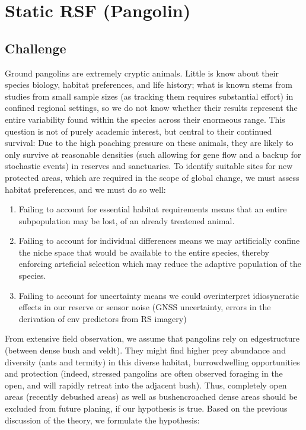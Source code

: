 \documentclass[letterpaper,10pt,english]{sphinxmanual}
\begin{document}
\section{Static RSF (Pangolin)}
\label{\detokenize{case-studies:static-rsf-pangolin}}

\subsection{Challenge}
\label{\detokenize{case-studies:challenge}}
\sphinxAtStartPar
Ground pangolins are extremely cryptic animals. Little is know about their species biology, habitat preferences, and life history; what is known stems from studies from small sample sizes (as tracking them requires substantial effort) in confined regional settings, so we do not know whether their results represent the entire variability found within the species across their enormeous range. This question is not of purely academic interest, but central to their continued survival: Due to the high poaching pressure on these animals, they are likely to only survive at reasonable densities (such allowing for gene flow and a back\sphinxhyphen{}up for stochastic events) in reserves and sanctuaries. To identify suitable sites for new protected areas, which are required in the scope of global change, we must assess habitat preferences, and we must do so well:
\begin{enumerate}
%
\item {} 
\sphinxAtStartPar
Failing to account for essential habitat requirements means that an entire subpopulation may be lost, of an already treatened animal.

\item {} 
\sphinxAtStartPar
Failing to account for individual differences means we may artificially confine the niche space that would be available to the entire species, thereby enforcing arteficial selection which may reduce the adaptive population of the species.

\item {} 
\sphinxAtStartPar
Failing to account for uncertainty means we could overinterpret idiosyncratic effects in our reserve or sensor noise (GNSS uncertainty, errors in the derivation of env predictors from RS imagery)

\end{enumerate}

\sphinxAtStartPar
From extensive field observation, we assume that pangolins rely on edge\sphinxhyphen{}structure (between dense bush and veldt). They might find higher prey abundance and diversity (ants and termity) in this diverse habitat, burrow\sphinxhyphen{}dwelling opportunities and protection (indeed, stressed pangolins are often observed foraging in the open, and will rapidly retreat into the adjacent bush). Thus, completely open areas (recently debushed areas) as well as bush\sphinxhyphen{}encroached dense areas should be excluded from future planing, if our hypothesis is true. Based on the previous discussion of the theory, we formulate the hypothesis:
\end{document}
